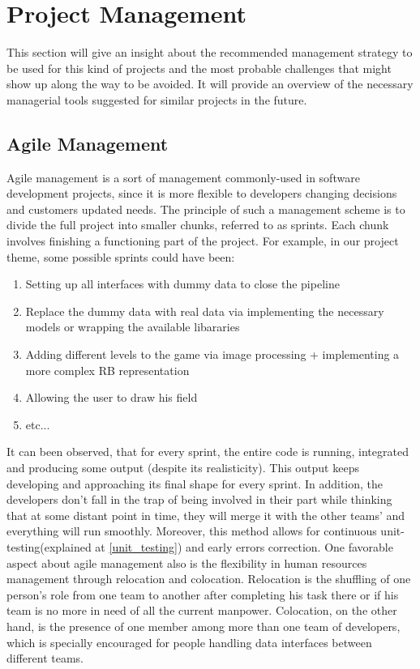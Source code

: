\section{Project Management}
This section will give an insight about the recommended management strategy to be used for this kind of projects and the most probable challenges that might show up along the way to be avoided. It will provide an overview of the necessary managerial tools suggested for similar projects in the future.


\subsection{Agile Management}
Agile management is a sort of management commonly-used in software development projects, since it is more flexible to developers changing decisions and customers updated needs. The principle of such a management scheme is to divide the full project into smaller chunks, referred to as sprints. Each chunk involves finishing a functioning part of the project. For example, in our project theme, some possible sprints could have been:
\begin{enumerate}
  \item{Setting up all interfaces with dummy data to close the pipeline}
  \item{Replace the dummy data with real data via implementing the necessary models or wrapping the available libararies}
  \item{Adding different levels to the game via image processing + implementing a more complex RB representation}
  \item{Allowing the user to draw his field}
  \item{etc...}
\end{enumerate}
It can been observed, that for every sprint, the entire code is running, integrated and producing some output (despite its realisticity). This output keeps developing and approaching its final shape for every sprint. In addition, the developers don't fall in the trap of being involved in their part while thinking that at some distant point in time, they will merge it with the other teams' and everything will run smoothly. Moreover, this method allows for continuous unit-testing(explained at \ref{unit_testing}) and early errors correction.
One favorable aspect about agile management also is the flexibility in human resources management through relocation and colocation. Relocation is the shuffling of one person's role from one team to another after completing his task there or if his team is no more in need of all the current manpower. Colocation, on the other hand, is the presence of one member among more than one team of developers, which is specially encouraged for people handling data interfaces between different teams.


